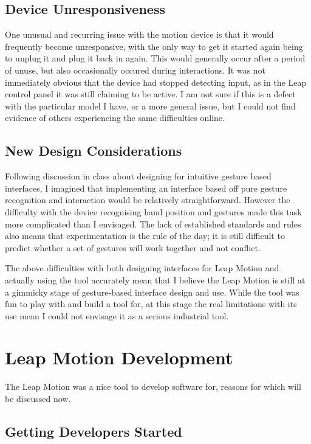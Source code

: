 \documentclass{sigplanconf}
\begin{document}
\subsection{Device Unresponsiveness}

One unusual and recurring issue with the motion device is that it would frequently become unresponsive, with the only way to get it started again being to unplug it and plug it back in again. This would generally occur after a period of unuse, but also occasionally occured during interactions. It was not immediately obvious that the device had stopped detecting input, as in the Leap control panel it was still claiming to be active. I am not sure if this is a defect with the particular model I have, or a more general issue, but I could not find evidence of others experiencing the same difficulties online.

\subsection{New Design Considerations}

Following discussion in class about designing for intuitive gesture based interfaces, I imagined that implementing an interface based off pure gesture recognition and interaction would be relatively straightforward. However the difficulty with the device recognising hand position and gestures made this task more complicated than I envisaged. The lack of established standards and rules also means that experimentation is the rule of the day; it is still difficult to predict whether a set of gestures will work together and not conflict. 

The above difficulties with both designing interfaces for Leap Motion and actually using the tool accurately mean that I believe the Leap Motion is still at a gimmicky stage of gesture-based interface design and use. While the tool was fun to play with and build a tool for, at this stage the real limitations with its use mean I could not envisage it as a serious industrial tool. 

\section{Leap Motion Development}
\label{sec:leap_development}

The Leap Motion was a nice tool to develop software for, reasons for which will be discussed now.

\subsection{Getting Developers Started}
\end{document}
